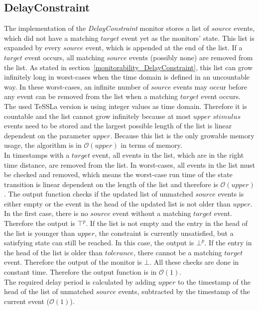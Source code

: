 \subsection{DelayConstraint}
	The implementation of the \emph{DelayConstraint} monitor stores a list of $source$ events, which did not have a matching $target$ event yet as the monitors' state. This list is expanded by every $source$ event, which is appended at the end of the list. If a $target$ event occurs, all matching $source$ events (possibly none) are removed from the list. As stated in section~\ref{monitorability_DelayConstraint}, this list can grow infinitely long in worst-cases when the time domain is defined in an uncountable way. In these worst-cases, an infinite number of $source$ events may occur before any event can be removed from the list when a matching $target$ event occurs.\\
	The used TeSSLa version is using integer values as time domain. Therefore it is countable and the list cannot grow infinitely because at most $upper$ $stimulus$ events need to be stored and the largest possible length of the list is linear dependent on the parameter $upper$. Because this list is the only growable memory usage, the algorithm is in $\mathcal{O}(upper)$ in terms of memory.\\
	In timestamps with a $target$ event, all events in the list, which are in the right time distance, are removed from the list. In worst-cases, all events in the list must be checked and removed, which means the worst-case run time of the state transition is linear dependent on the length of the list and therefore is $\mathcal{O}(upper)$. %
	The output function checks if the updated list of unmatched $source$ events is either empty or the event in the head of the updated list is not older than $upper$. In the first case, there is no $source$ event without a matching $target$ event. Therefore the output is $\top^p$. If the list is not empty and the entry in the head of the list is younger than $upper$, the constraint is currently unsatisfied, but a satisfying state can still be reached. In this case, the output is $\bot^p$. If the entry in the head of the list is older than $tolerance$, there cannot be a matching $target$ event. Therefore the output of the monitor is $\bot$. All these checks are done in constant time. Therefore the output function is in $\mathcal{O}(1)$.\\
	The required delay period is calculated by adding $upper$ to the timestamp of the head of the list of unmatched $source$ events, subtracted by the timestamp of the current event ($\mathcal{O}(1)$).
	
